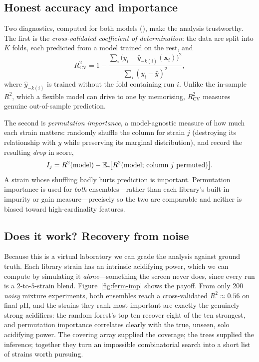 \subsection{Honest accuracy and importance}

Two diagnostics, computed for both models (), make the
analysis trustworthy. The first is the \emph{cross-validated coefficient of
determination}: the data are split into $K$ folds, each predicted from a model
trained on the rest, and
%
\begin{equation}
R^2_{\mathrm{CV}} = 1 -
\frac{\sum_i \bigl(y_i - \hat y_{-k(i)}(\bm x_i)\bigr)^2}
     {\sum_i (y_i-\bar y)^2},
\end{equation}
%
where $\hat y_{-k(i)}$ is trained without the fold containing run $i$. Unlike the
in-sample $R^2$, which a flexible model can drive to one by memorising, $R^2_{\mathrm{CV}}$
measures genuine out-of-sample prediction.

The second is \emph{permutation importance}, a model-agnostic measure of how much
each strain matters: randomly shuffle the column for strain $j$ (destroying its
relationship with $y$ while preserving its marginal distribution), and record the
resulting \emph{drop} in score,
%
\begin{equation}
I_j = R^2(\text{model}) - \mathbb{E}_{\pi}\!\bigl[R^2(\text{model};\,
      \text{column } j \text{ permuted})\bigr].
\label{eq:permimp}
\end{equation}
%
A strain whose shuffling badly hurts prediction is important. Permutation
importance is used for \emph{both} ensembles---rather than each library's built-in
impurity or gain measure---precisely so the two are comparable and neither is
biased toward high-cardinality features.

\subsection{Does it work? Recovery from noise}

Because this is a virtual laboratory we can grade the analysis against ground
truth. Each library strain has an intrinsic acidifying power, which we can compute
by simulating it \emph{alone}---something the screen never does, since every run is
a $2$-to-$5$-strain blend. Figure~\ref{fig:ferm-imp} shows the payoff. From only
$200$ \emph{noisy} mixture experiments, both ensembles reach a cross-validated
$R^2\approx 0.56$ on final pH, and the strains they rank most important are exactly
the genuinely strong acidifiers: the random forest's top ten recover eight of the
ten strongest, and permutation importance correlates clearly with the true,
unseen, solo acidifying power. The covering array supplied the coverage; the trees
supplied the inference; together they turn an impossible combinatorial search into
a short list of strains worth pursuing.

